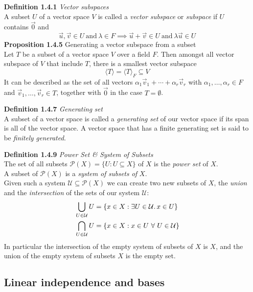 \documentclass[8pt,landscape]{article}
\begin{document}
\begin{multicols}{3}
    \textbf{Definition 1.4.1} \emph{Vector subspaces} \\
    A subset $U$ of a vector space $V$ is called a \emph{vector subspace} or
    \emph{subspace} if $U$ contains $\vec{0}$ and
    \[
        \vec{u}, \vec{v} \in U \ \text{and} \ \lambda \in F \implies
        \vec{u} + \vec{v} \in U \ \text{and} \ \lambda \vec{u} \in U
    \]
    \textbf{Proposition 1.4.5} Generating a vector subspace from a subset \\
    Let $T$ be a subset of a vector space $V$ over a field $F$.
    Then amongst all vector subspace of $V$ that include $T$,
    there is a smallest vector subspace
    \[
        \langle T \rangle = \langle T \rangle _F \subseteq V
    \]
    It can be described as the set of all vectors
    $\alpha_1 \vec{v}_1 + \cdots + \alpha_r \vec{v}_r$ with
    $\alpha_1, \ldots, \alpha_r \in F$ and $\vec{v}_1, \ldots, \vec{v}_r \in T$,
    together with $\vec{0}$ in the case $T = \emptyset$.

    \textbf{Definition 1.4.7} \emph{Generating set} \\
    A subset of a vector space is called a \emph{generating set} of our vector space if its
    span is all of the vector space.
    A vector space that has a finite generating set is said to be
    \emph{finitely generated}.

    \textbf{Definition 1.4.9} \emph{Power Set \& System of Subsets} \\
    The set of all subsets $\mathcal{P}(X) = \{U : U \subseteq X \}$ of $X$ is the
    \emph{power set} of $X$. \\
    A subset of $\mathcal{P}(X)$ is a \emph{system of subsets of} $X$. \\
    Given such a system $\mathcal{U} \subseteq \mathcal{P}(X)$ we can create two new
    subsets of $X$,
    the \emph{union} and the \emph{intersection} of the sets of our system $\mathcal{U}$:
    \begin{align*}{}
        \bigcup_{U \in \mathcal{U}} U &=
        \{x \in X : \exists U \in \mathcal{U} \ldotp x \in U\} \\
        \bigcap_{U \in \mathcal{U}} U &=
        \{x \in X : x \in U \ \forall \ U \in \mathcal{U}\}
    \end{align*}
    In particular the intersection of the empty system of subsets of $X$ is $X$,
    and the union of the empty system of subsets $X$ is the empty set.

    \subsection{Linear independence and bases}


\end{multicols}
\end{document}
